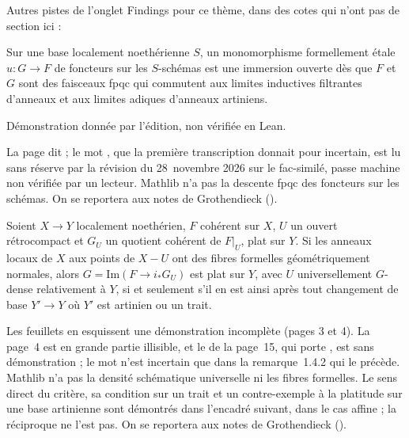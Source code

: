 \bigskip
\noindent Autres pistes de l'onglet Findings pour ce thème, dans des cotes qui n'ont pas de section ici :\par

\begin{encadre}
\begin{theoreme*}\nonverifie
Sur une base localement noethérienne $S$, un monomorphisme formellement étale $u : G \to F$ de foncteurs sur les $S$-schémas est une immersion ouverte dès que $F$ et $G$ sont des faisceaux fpqc qui commutent aux limites inductives filtrantes d'anneaux et aux limites adiques d'anneaux artiniens.
\end{theoreme*}
\end{encadre}
{\small Démonstration donnée par l'édition, non vérifiée en Lean.\par}
{\small La page dit  ; le mot , que la première transcription donnait pour incertain, est lu sans réserve par la révision du 28~novembre 2026 sur le fac-similé, passe machine non vérifiée par un lecteur. Mathlib n'a pas la descente fpqc des foncteurs sur les schémas. On se reportera aux notes de Grothendieck ().\par}

\begin{encadre}
\begin{theoreme*}\nonverifie
Soient $X \to Y$ localement noethérien, $F$ cohérent sur $X$, $U$ un ouvert rétrocompact et $G_U$ un quotient cohérent de $F|_U$, plat sur $Y$. Si les anneaux locaux de $X$ aux points de $X - U$ ont des fibres formelles géométriquement normales, alors $G = \mathrm{Im}(F \to i_*G_U)$ est plat sur $Y$, avec $U$ universellement $G$-dense relativement à $Y$, si et seulement s'il en est ainsi après tout changement de base $Y' \to Y$ où $Y'$ est artinien ou un trait.
\end{theoreme*}
\end{encadre}
{\small Les feuillets en esquissent une démonstration incomplète (pages 3 et 4). La page~4 est en grande partie illisible, et le  de la page~15, qui porte , est sans démonstration ; le mot  n'est incertain que dans la remarque~1.4.2 qui le précède. Mathlib n'a pas la densité schématique universelle ni les fibres formelles. Le sens direct du critère, sa condition sur un trait et un contre-exemple à la platitude sur une base artinienne sont démontrés dans l'encadré suivant, dans le cas affine ; la réciproque ne l'est pas. On se reportera aux notes de Grothendieck ().\par}

